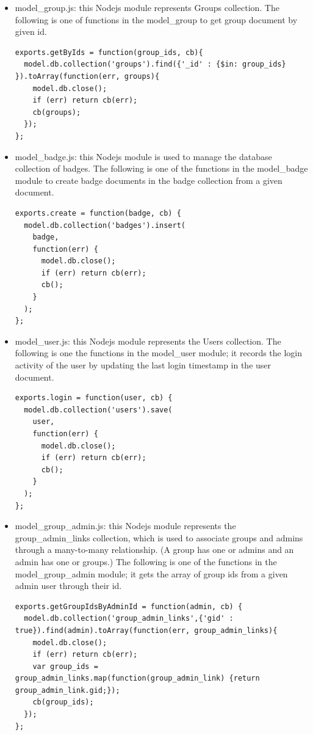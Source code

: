 \begin{itemize}
\item model{\_}group.js: this Nodejs module represents Groups collection. The following is one of functions in the model{\_}group to get group document by given id. 

\begin{lstlisting}
exports.getByIds = function(group_ids, cb){
  model.db.collection('groups').find({'_id' : {$in: group_ids} }).toArray(function(err, groups){
    model.db.close();
    if (err) return cb(err);
    cb(groups);
  });
};
\end{lstlisting}

\item model{\_}badge.js: this Nodejs module is used to manage the database collection of badges. The following is one of the functions in the model{\_}badge module to create badge documents in the badge collection from a given document.  

\begin{lstlisting}
exports.create = function(badge, cb) {
  model.db.collection('badges').insert(
    badge,
    function(err) {
      model.db.close();
      if (err) return cb(err); 
      cb();
    }
  );  
};
\end{lstlisting}

\item model{\_}user.js: this Nodejs module represents the Users collection. The following is one the functions in the model{\_}user module; it records the login activity of the user by updating the last login timestamp in the user document.

\begin{lstlisting}
exports.login = function(user, cb) {
  model.db.collection('users').save(
    user,
    function(err) {
      model.db.close();
      if (err) return cb(err); 
      cb();
    }
  ); 
};
\end{lstlisting}

\item model{\_}group{\_}admin.js: this Nodejs module represents the group{\_}admin{\_}links collection, which is used to associate groups and admins through a many-to-many relationship.  (A group has one or admins and an admin has one or groups.) The following is one of the functions in the model{\_}group{\_}admin module; it gets the array of group ids from a given admin user through their id.

\begin{lstlisting}
exports.getGroupIdsByAdminId = function(admin, cb) {
  model.db.collection('group_admin_links',{'gid' : true}).find(admin).toArray(function(err, group_admin_links){
    model.db.close();
    if (err) return cb(err);
    var group_ids = group_admin_links.map(function(group_admin_link) {return group_admin_link.gid;});
    cb(group_ids);
  });    
};
\end{lstlisting}



\end{itemize}

